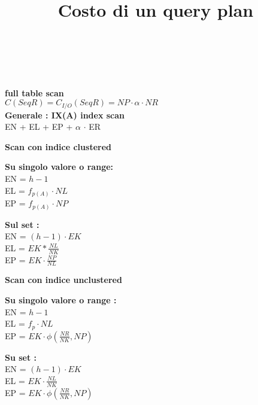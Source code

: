 \documentclass[a4paper,12pt]{article}
\begin{document}
\begin{titlepage}
\begin{titlepage}
		\title{\huge \textbf{Costo di un query plan}} \\ \\
		\maketitle
		\textbf{full table scan} \\
		${C(SeqR) = C_{I/O}(SeqR) = NP \cdot \alpha \cdot NR}$ \\
		\textbf{Generale : IX(A) index scan} \\ 
		EN + EL + EP + $\alpha$ $\cdot$ ER \\ 
	\begin{center}
			\textbf{ \huge Scan con indice clustered} \\
	\end{center}
	\begin{center}
			\textbf{Su singolo valore o range:} \\
		EN = ${h - 1}$ \\
		EL = ${f_{p(A)} \cdot NL}$ \\
		EP = ${f_{p(A)} \cdot NP}$ \\
	\end{center}
	\begin{center}
		\textbf{Sul set :} \\ 
	EN = ${(h - 1) \cdot EK}$ \\
	EL = ${EK * \tfrac{NL}{NK}}$ \\
	EP = ${EK \cdot \tfrac{NP}{NL}}$ \\
	\end{center}
	\begin{center}
		\textbf{ \huge Scan con indice unclustered} \\
	\end{center}
		\begin{center}
			\textbf{Su singolo valore o range : } \\
		EN = ${h - 1}$ \\
		EL = ${f_{p} \cdot NL}$ \\
		EP = ${EK \cdot \phi(\tfrac{NR}{NK},NP)}$ \\
		\end{center} 
		\begin{center}
			\textbf{Su set : } \\
		EN = ${(h - 1) \cdot EK}$ \ \\
		EL = ${EK \cdot \tfrac{NL}{NK}}$ \\
		EP = ${EK \cdot \phi(\tfrac{NR}{NK},NP)}$ \\	

\end{center}
\end{titlepage}
\end{titlepage}
\end{document}
